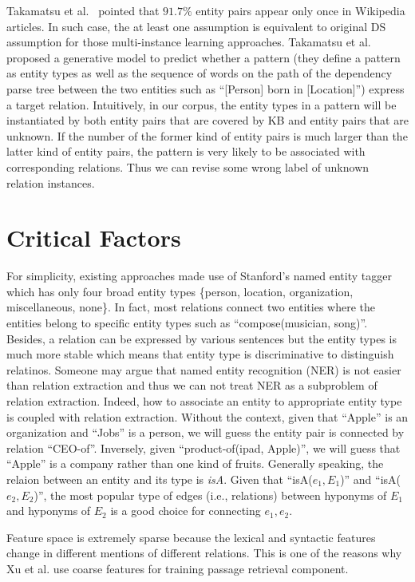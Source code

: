 \documentclass[10pt]{article} %
\theoremstyle{definition}
\theoremstyle{definition}
\begin{document}
Takamatsu et al.~\cite{takamatsu} pointed that $91.7\%$ entity pairs appear only once in Wikipedia articles. 
In such case, the at least one assumption is equivalent to original DS assumption for those multi-instance learning approaches. 
Takamatsu et al. proposed a generative model to predict whether a pattern (they define a pattern as entity types as well as the sequence of words on the path of the dependency parse tree between the two entities such as ``[Person] born in [Location]'') express a target relation. 
Intuitively, in our corpus, the entity types in a pattern will be instantiated by both entity pairs that are covered by KB and entity pairs that are unknown. 
If the number of the former kind of entity pairs is much larger than the latter kind of entity pairs, the pattern is very likely to be associated with corresponding relations. 
Thus we can revise some wrong label of unknown relation instances. 


\section{Critical Factors}
For simplicity, existing approaches made use of Stanford's named entity tagger which has only four broad entity types \{person, location, organization, miscellaneous, none\}. 
In fact, most relations connect two entities where the entities belong to specific entity types such as ``compose(musician, song)''. 
Besides, a relation can be expressed by various sentences but the entity types is much more stable which means that 
entity type is discriminative to distinguish relatinos. 
Someone may argue that named entity recognition (NER) is not easier than relation extraction and thus we can not treat NER as a subproblem of relation extraction. 
Indeed, how to associate an entity to appropriate entity type is coupled with relation extraction. 
Without the context, given that ``Apple'' is an organization and ``Jobs'' is a person, we will guess the entity pair is connected by relation ``CEO-of''. 
Inversely, given ``product-of(ipad, Apple)'', we will guess that ``Apple'' is a company rather than one kind of fruits. 
Generally speaking, the relaion between an entity and its type is \emph{isA}. 
Given that ``isA($e_1, E_1$)'' and ``isA($e_2, E_2$)'', the most popular type of edges (i.e., relations) between hyponyms of $E_1$ and hyponyms of $E_2$ is a good choice for connecting $e_1, e_2$. 


Feature space is extremely sparse because the lexical and syntactic features change in different mentions of different relations. 
This is one of the reasons why Xu et al. use coarse features for training passage retrieval component. 
\end{document}
